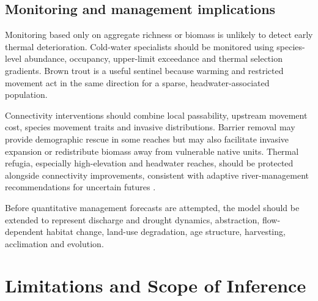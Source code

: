 \documentclass[11pt,a4paper]{article}
\begin{document}
\subsection{Monitoring and management implications}

Monitoring based only on aggregate richness or biomass is unlikely to detect early thermal deterioration. Cold-water specialists should be monitored using species-level abundance, occupancy, upper-limit exceedance and thermal selection gradients. Brown trout is a useful sentinel because warming and restricted movement act in the same direction for a sparse, headwater-associated population.

Connectivity interventions should combine local passability, upstream movement cost, species movement traits and invasive distributions. Barrier removal may provide demographic rescue in some reaches but may also facilitate invasive expansion or redistribute biomass away from vulnerable native units. Thermal refugia, especially high-elevation and headwater reaches, should be protected alongside connectivity improvements, consistent with adaptive river-management recommendations for uncertain futures \cite{tonkin2018preparing}.

Before quantitative management forecasts are attempted, the model should be extended to represent discharge and drought dynamics, abstraction, flow-dependent habitat change, land-use degradation, age structure, harvesting, acclimation and evolution.

\section{Limitations and Scope of Inference}
\end{document}

